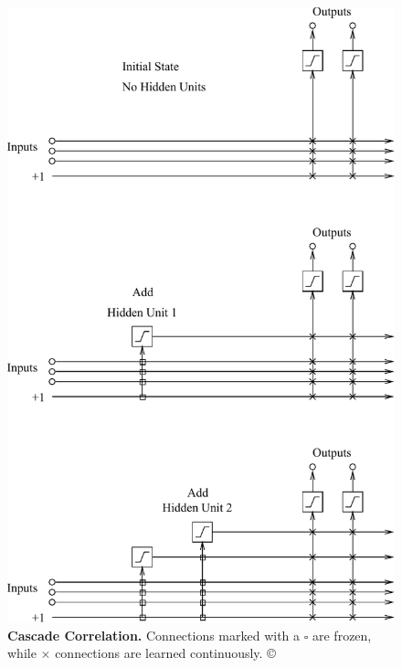 \documentclass[thesis]{subfiles}
\begin{document}
	\begin{figure}[tbp]
		\centering
		\includegraphics{Figs/PDF/fahlmancascade}
		\caption[Cascade correlation.]{\textbf{Cascade Correlation.} Connections marked with a $\square$ are frozen, while $\times$ connections are learned continuously. \copyright~\citet{Fahlman1989}}
		\label{fig:cascadecorrelation}
	\end{figure}
	
\end{document}
